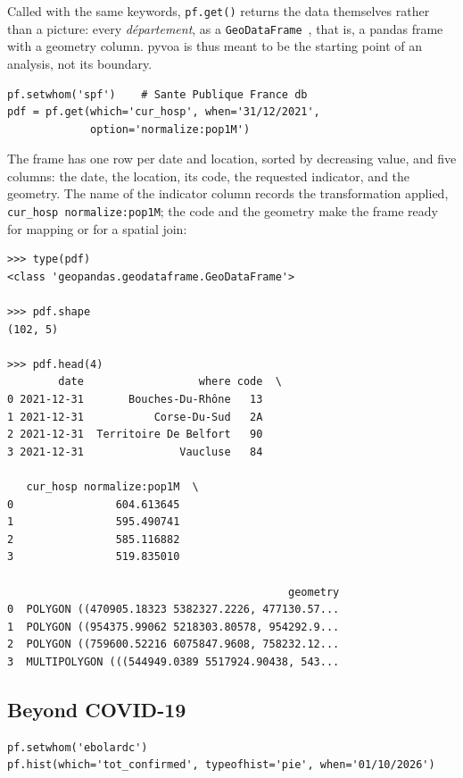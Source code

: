 \documentclass[preprint,12pt,a4paper]{elsarticle}
\begin{document}
Called with the same keywords, \texttt{pf.get()} returns the data themselves
rather than a picture: every \emph{département}, as a
\texttt{GeoDataFrame}~\cite{geopandas}, that is, a pandas
frame~\cite{mckinney2010} with a geometry column. pyvoa is thus meant to be
the starting point of an analysis, not its boundary.

\begin{lstlisting}[style=python]
pf.setwhom('spf')    # Sante Publique France db
pdf = pf.get(which='cur_hosp', when='31/12/2021',
             option='normalize:pop1M')
\end{lstlisting}

\noindent The frame has one row per date and location, sorted by decreasing
value, and five columns: the date, the location, its code, the requested
indicator, and the geometry. The name of the indicator column records the
transformation applied, \texttt{cur\_hosp normalize:pop1M}; the code and the
geometry make the frame ready for mapping or for a spatial join:

\begin{lstlisting}[style=pyout]
>>> type(pdf)
<class 'geopandas.geodataframe.GeoDataFrame'>

>>> pdf.shape
(102, 5)

>>> pdf.head(4)
        date                  where code  \
0 2021-12-31       Bouches-Du-Rhône   13
1 2021-12-31           Corse-Du-Sud   2A
2 2021-12-31  Territoire De Belfort   90
3 2021-12-31               Vaucluse   84

   cur_hosp normalize:pop1M  \
0                604.613645
1                595.490741
2                585.116882
3                519.835010

                                            geometry
0  POLYGON ((470905.18323 5382327.2226, 477130.57...
1  POLYGON ((954375.99062 5218303.80578, 954292.9...
2  POLYGON ((759600.52216 6075847.9608, 758232.12...
3  MULTIPOLYGON (((544949.0389 5517924.90438, 543...
\end{lstlisting}

\subsection{Beyond COVID-19}
\label{sec:ex-beyond}

\begin{lstlisting}[style=python]
pf.setwhom('ebolardc')
pf.hist(which='tot_confirmed', typeofhist='pie', when='01/10/2026')
\end{lstlisting}
\end{document}
